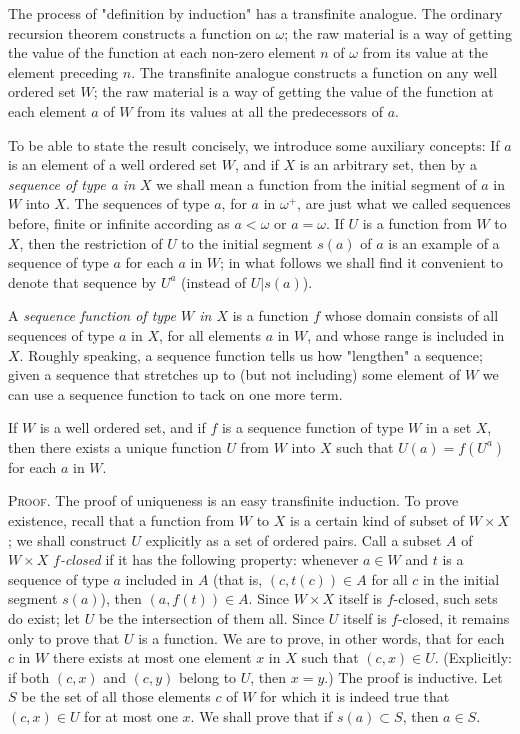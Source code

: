 
The process of "definition by induction" has a   transfinite analogue. The ordinary recursion theorem constructs a function on $\omega$; the raw material is a way of getting the value of the function at each non-zero element $n$ of $\omega$ from its value at the element preceding $n$. The transfinite analogue constructs a function on any well ordered set $W$; the raw material is a way of getting the value of the function at each element $a$ of $W$ from its values at all the predecessors of $a$. 

To be able to state the result concisely, we introduce some auxiliary concepts: If $a$ is an element of a well ordered set $W$, and if $X$ is an arbitrary set, then by a \textit{sequence of type a in $X$} we shall mean a function from the initial segment of $a$ in $W$ into $X$. The sequences of type $a$, for $a$ in $\omega^{+}$, are just what we called sequences before, finite or infinite according as $a < \omega$ or $a =  \omega$. If $U$ is a function from $W$ to $X$, then the restriction of $U$ to the initial segment $s(a)$ of $a$ is an example of a sequence of type $a$ for each $a$ in $W$; in what follows we shall find it convenient to denote that sequence by $U^{a}$ (instead of $U | s(a)$).

A \textit{sequence function of type $W$ in $X$} is a function $f$ whose domain consists of all sequences of type $a$ in $X$, for all elements $a$ in $W$, and whose range is included in $X$. Roughly speaking, a sequence function tells us how "lengthen" a sequence; given a sequence that stretches up to (but not including) some element of $W$ we can use a sequence function to tack on one more term. 

\begin{named} If $W$ is a well ordered set, and if $f$ is a sequence function of type $W$ in a set $X$, then there exists a unique function $U$ from $W$ into $X$ such that $U(a) = f(U^{a})$ for each $a$ in $W$.
\end{named}

\textsc{Proof}. The proof of uniqueness is an easy transfinite induction. To prove existence, recall that a function from $W$ to $X$ is a certain kind of subset of $W \times X$; we shall construct $U$ explicitly as a set of ordered pairs. Call a subset $A$ of $W \times X$ $f$\textit{-closed} if it has the following property: whenever $a \in W$ and $t$ is a sequence of type $a$ included in $A$ (that is, $(c, t(c)) \in A$ for all $c$ in the initial segment $s(a)$), then $(a,f(t)) \in A$. Since $W \times X$ itself is $f$-closed, such sets do exist; let $U$ be the intersection of them all. Since $U$ itself is $f$-closed, it remains only to prove that $U$ is a function. We are to prove, in other words, that for each $c$ in $W$ there exists at most one element $x$ in $X$ such that $(c,x) \in U$. (Explicitly: if both $(c, x)$ and $(c,y)$ belong to $U$, then $x = y$.) The proof is inductive. Let $S$ be the set of all those elements $c$ of $W$ for which it is indeed true that $(c, x) \in U$ for at most one $x$. We shall prove that if $s(a) \subset S$, then $a \in S$. 

